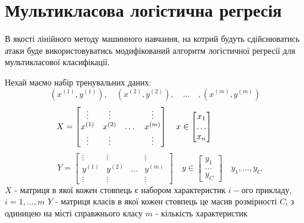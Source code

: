 \documentclass[a4paper,12pt]{extreport}
\begin{document}
	\section{Мультикласова логістична регресія}
	\label{sec:lg}
	В якості лінійного методу машинного навчання, на котрий будуть сдійснюватись атаки буде використовуватись модифікований алгоритм логістичної регресії для мультикласової класифікації. \par
	Нехай маємо набір тренувальних даних:
	\begin{equation*}
		(x^{(1)}, y^{(1)}), \quad (x^{(2)}, y^{(2)}), \quad ... \quad ,(x^{(m)}, y^{(m)})
	\end{equation*}
	\begin{equation*}
		\quad
		X =	
		\begin{bmatrix}
		\vdots  & \vdots  & & \vdots \\
		x^{(1)} & x^{(2)} &   \dots & x^{(m)}\\
		\vdots  & \vdots  & & \vdots
		\end{bmatrix}
		\quad
		x \in
		\begin{bmatrix}
		x_1   \\
		\dots \\
		x_n
		\end{bmatrix}
		\hspace{21 mm}
	\end{equation*}
	\begin{equation*}
		\quad
		Y =	
		\begin{bmatrix}
		\vdots  & \vdots  & & \vdots \\
		y^{(1)} & y^{(2)} &   \dots & y^{(m)}\\
		\vdots  & \vdots  & & \vdots
		\end{bmatrix}
		\quad
		y \in
		\begin{bmatrix}
		y_1   \\
		\dots \\
		y_C
		\end{bmatrix}
		\quad
		y_1, ..., y_C
	\end{equation*}
	\newline
	$X$ - матриця в якої кожен стовпець є набором характеристик $i-$ого прикладу, \newline $i=1,\dots,m$ 
	\newline
	$Y$ - матриця класів в якої кожен стовпець це масив розмірності $C$, з одиницею на місті справжнього класу
	\newline
	$m$ - кількість характеристик
	\newline
\end{document}
